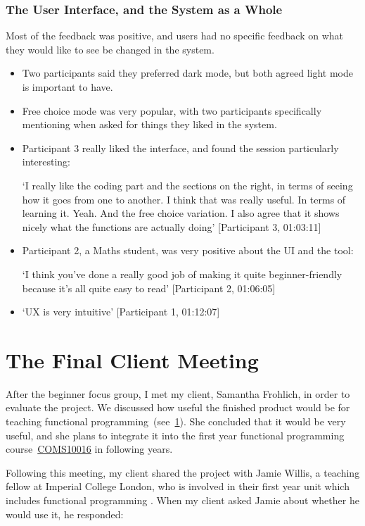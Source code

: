\subsubsection{The User Interface, and the System as a Whole}
Most of the feedback was positive, and users had no specific feedback on what they would like to see be changed in the system. 

\begin{itemize}
    \item Two participants said they preferred dark mode, but both agreed light mode is important to have.
    
    \item Free choice mode was very popular, with two participants specifically mentioning when asked for things they liked in the system. 

    \item Participant 3 really liked the interface, and found the session particularly interesting:
    
    `I really like the coding part and the sections on the right, in terms of seeing how it goes from one to another. I think that was really useful. In terms of learning it. Yeah. And the free choice variation. I also agree that it shows nicely what the functions are actually doing' [Participant 3, 01:03:11]

    \item Participant 2, a Maths student, was very positive about the UI and the tool:
    
    `I think you've done a really good job of making it quite beginner-friendly because it's all quite easy to read' [Participant 2, 01:06:05]

    \item `UX is very intuitive' [Participant 1, 01:12:07]
\end{itemize}

\section{The Final Client Meeting}
\label{c4:client}
After the beginner focus group, I met my client, Samantha Frohlich, in order to evaluate the project. We discussed how useful the finished product would be for teaching functional programming~(see~\ref{c4:client}). She concluded that it would be very useful, and she plans to integrate it into the first year functional programming course~\hyperref[COMS10016]{COMS10016} in following years. 

Following this meeting, my client shared the project with Jamie Willis, a teaching fellow at Imperial College London, who is involved in their first year unit which includes functional programming \cite{imperialFP}. When my client asked Jamie about whether he would use it, he responded:

